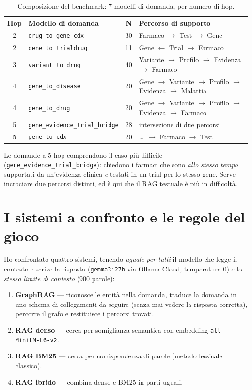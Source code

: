\documentclass[11pt,a4paper]{report}
\begin{document}
\begin{table}[H]
\centering
\caption{Composizione del benchmark: 7 modelli di domanda, per numero di hop.}
\label{tab:benchmark}
\begin{tabular}{clcl}
\toprule
\textbf{Hop} & \textbf{Modello di domanda} & \textbf{N} & \textbf{Percorso di supporto} \\
\midrule
2 & \texttt{drug\_to\_gene\_cdx}          & 30 & Farmaco $\to$ Test $\to$ Gene \\
2 & \texttt{gene\_to\_trialdrug}          & 11 & Gene $\leftarrow$ Trial $\to$ Farmaco \\
3 & \texttt{variant\_to\_drug}            & 40 & Variante $\to$ Profilo $\to$ Evidenza $\to$ Farmaco \\
4 & \texttt{gene\_to\_disease}            & 20 & Gene $\to$ Variante $\to$ Profilo $\to$ Evidenza $\to$ Malattia \\
4 & \texttt{gene\_to\_drug}               & 20 & Gene $\to$ Variante $\to$ Profilo $\to$ Evidenza $\to$ Farmaco \\
5 & \texttt{gene\_evidence\_trial\_bridge}& 28 & intersezione di due percorsi \\
5 & \texttt{gene\_to\_cdx}                & 20 & \dots\ $\to$ Farmaco $\to$ Test \\
\bottomrule
\end{tabular}
\end{table}

Le domande a 5 hop comprendono il caso più difficile
(\texttt{gene\_evidence\_trial\_bridge}): chiedono i farmaci che sono
\emph{allo stesso tempo} supportati da un'evidenza clinica \emph{e} testati
in un trial per lo stesso gene. Serve incrociare due percorsi distinti, ed
è qui che il RAG testuale è più in difficoltà.

\section{I sistemi a confronto e le regole del gioco}

Ho confrontato quattro sistemi, tenendo \emph{uguale per tutti} il modello
che legge il contesto e scrive la risposta (\texttt{gemma3:27b} via Ollama
Cloud, temperatura 0) e lo \emph{stesso limite di contesto} (900 parole):

\begin{enumerate}
  \item \textbf{GraphRAG} --- riconosce le entità nella domanda, traduce la
        domanda in uno schema di collegamenti da seguire (senza mai vedere
        la risposta corretta), percorre il grafo e restituisce i percorsi
        trovati.
  \item \textbf{RAG denso} --- cerca per somiglianza semantica con embedding
        \texttt{all-MiniLM-L6-v2}.
  \item \textbf{RAG BM25} --- cerca per corrispondenza di parole (metodo
        lessicale classico).
  \item \textbf{RAG ibrido} --- combina denso e BM25 in parti uguali.
\end{enumerate}
\end{document}
